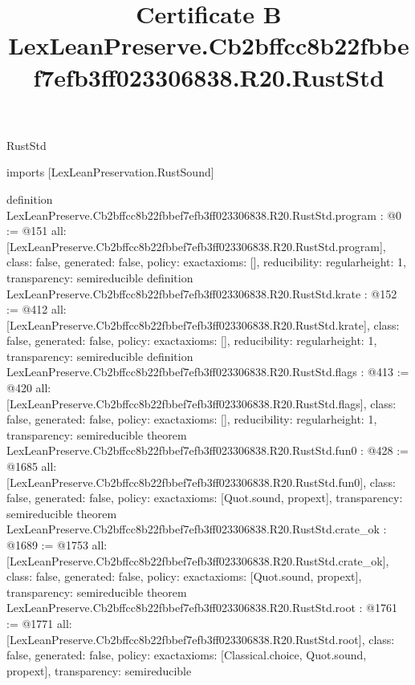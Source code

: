 \begin{lexlean}{RustStd}
\title{Certificate B LexLeanPreserve.Cb2bffcc8b22fbbef7efb3ff023306838.R20.RustStd}
\begin{coremodule}
imports [LexLeanPreservation.RustSound]

definition LexLeanPreserve.Cb2bffcc8b22fbbef7efb3ff023306838.R20.RustStd.program : @0 := @151 {
  all: [LexLeanPreserve.Cb2bffcc8b22fbbef7efb3ff023306838.R20.RustStd.program],
  class: false,
  generated: false,
  policy: exact{axioms: []},
  reducibility: regular{height: 1},
  transparency: semireducible
}
definition LexLeanPreserve.Cb2bffcc8b22fbbef7efb3ff023306838.R20.RustStd.krate : @152 := @412 {
  all: [LexLeanPreserve.Cb2bffcc8b22fbbef7efb3ff023306838.R20.RustStd.krate],
  class: false,
  generated: false,
  policy: exact{axioms: []},
  reducibility: regular{height: 1},
  transparency: semireducible
}
definition LexLeanPreserve.Cb2bffcc8b22fbbef7efb3ff023306838.R20.RustStd.flags : @413 := @420 {
  all: [LexLeanPreserve.Cb2bffcc8b22fbbef7efb3ff023306838.R20.RustStd.flags],
  class: false,
  generated: false,
  policy: exact{axioms: []},
  reducibility: regular{height: 1},
  transparency: semireducible
}
theorem LexLeanPreserve.Cb2bffcc8b22fbbef7efb3ff023306838.R20.RustStd.fun0 : @428 := @1685 {
  all: [LexLeanPreserve.Cb2bffcc8b22fbbef7efb3ff023306838.R20.RustStd.fun0],
  class: false,
  generated: false,
  policy: exact{axioms: [Quot.sound, propext]},
  transparency: semireducible
}
theorem LexLeanPreserve.Cb2bffcc8b22fbbef7efb3ff023306838.R20.RustStd.crate_ok : @1689 := @1753 {
  all: [LexLeanPreserve.Cb2bffcc8b22fbbef7efb3ff023306838.R20.RustStd.crate_ok],
  class: false,
  generated: false,
  policy: exact{axioms: [Quot.sound, propext]},
  transparency: semireducible
}
theorem LexLeanPreserve.Cb2bffcc8b22fbbef7efb3ff023306838.R20.RustStd.root : @1761 := @1771 {
  all: [LexLeanPreserve.Cb2bffcc8b22fbbef7efb3ff023306838.R20.RustStd.root],
  class: false,
  generated: false,
  policy: exact{axioms: [Classical.choice, Quot.sound, propext]},
  transparency: semireducible
}


\end{coremodule}
\end{lexlean}
